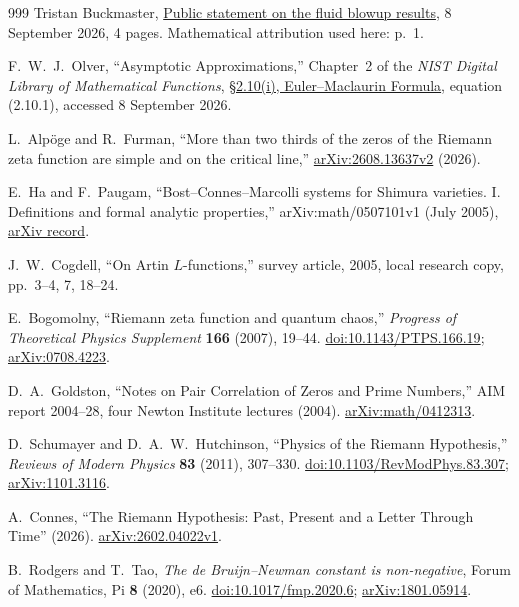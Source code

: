 \begin{thebibliography}{999}
Tristan Buckmaster,
\href{https://cims.nyu.edu/~tristanb/statement.pdf}{Public statement
on the fluid blowup results}, 8 September 2026, 4 pages.
Mathematical attribution used here: p.~1.

F.~W.~J.~Olver,
``Asymptotic Approximations,'' Chapter~2 of the
\emph{NIST Digital Library of Mathematical Functions},
\href{https://dlmf.nist.gov/2.10}{\S2.10(i), Euler--Maclaurin Formula},
equation (2.10.1), accessed 8 September 2026.

L.~Alp\"oge and R.~Furman,
``More than two thirds of the zeros of the Riemann zeta function are simple
and on the critical line,''
\href{https://arxiv.org/abs/2608.13637v2}{arXiv:2608.13637v2} (2026).

E.~Ha and F.~Paugam,
``Bost--Connes--Marcolli systems for Shimura varieties. I. Definitions and
formal analytic properties,''
arXiv:math/0507101v1 (July 2005),
\href{https://arxiv.org/abs/math/0507101}{arXiv record}.

J.~W.~Cogdell,
``On Artin $L$-functions,'' survey article, 2005,
local research copy, pp.~3--4, 7, 18--24.

E.~Bogomolny,
``Riemann zeta function and quantum chaos,''
\emph{Progress of Theoretical Physics Supplement} \textbf{166} (2007), 19--44.
\href{https://doi.org/10.1143/PTPS.166.19}{doi:10.1143/PTPS.166.19};
\href{https://arxiv.org/abs/0708.4223}{arXiv:0708.4223}.

D.~A.~Goldston,
``Notes on Pair Correlation of Zeros and Prime Numbers,''
AIM report 2004--28, four Newton Institute lectures (2004).
\href{https://arxiv.org/abs/math/0412313}{arXiv:math/0412313}.

D.~Schumayer and D.~A.~W.~Hutchinson,
``Physics of the Riemann Hypothesis,''
\emph{Reviews of Modern Physics} \textbf{83} (2011), 307--330.
\href{https://doi.org/10.1103/RevModPhys.83.307}{doi:10.1103/RevModPhys.83.307};
\href{https://arxiv.org/abs/1101.3116}{arXiv:1101.3116}.

A.~Connes,
``The Riemann Hypothesis: Past, Present and a Letter Through Time'' (2026).
\href{https://arxiv.org/abs/2602.04022}{arXiv:2602.04022v1}.

B.~Rodgers and T.~Tao,
\emph{The de Bruijn--Newman constant is non-negative},
Forum of Mathematics, Pi \textbf{8} (2020), e6.
\href{https://doi.org/10.1017/fmp.2020.6}{doi:10.1017/fmp.2020.6};
\href{https://arxiv.org/abs/1801.05914}{arXiv:1801.05914}.


\end{thebibliography}
